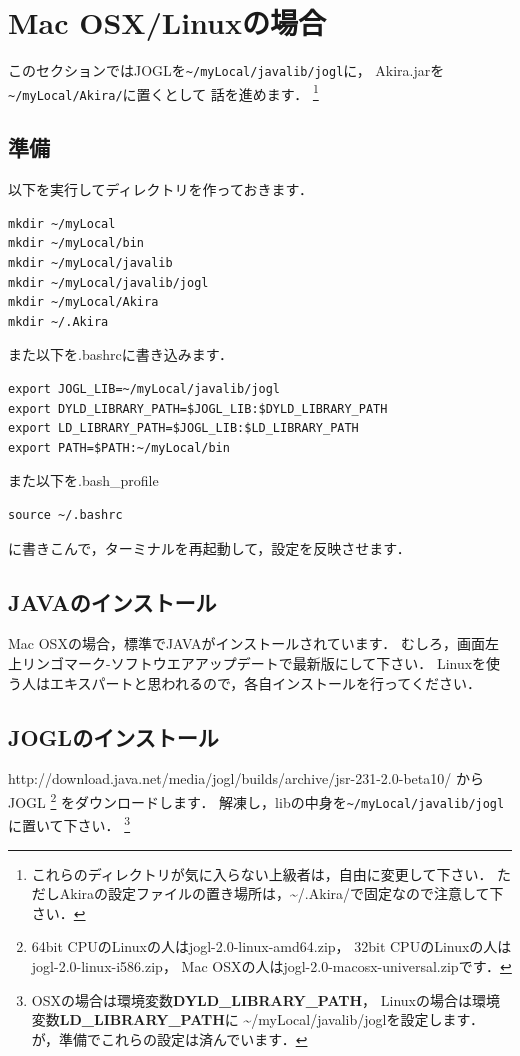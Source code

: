 \documentclass[a4j,openany]{jbook}
\begin{document}
 \section{Mac OSX/Linuxの場合}
 このセクションではJOGLを\verb|~/myLocal/javalib/jogl|に，
 Akira.jarを\verb|~/myLocal/Akira/|に置くとして
 話を進めます．
 \footnote{これらのディレクトリが気に入らない上級者は，自由に変更して下さい．
 ただしAkiraの設定ファイルの置き場所は，\~{}/.Akira/で固定なので注意して下さい．}

  \subsection{準備}
  以下を実行してディレクトリを作っておきます．
   \begin{screen}
\begin{verbatim}
mkdir ~/myLocal
mkdir ~/myLocal/bin
mkdir ~/myLocal/javalib
mkdir ~/myLocal/javalib/jogl
mkdir ~/myLocal/Akira
mkdir ~/.Akira
\end{verbatim}
   \end{screen}

また以下を.bashrcに書き込みます．
    \begin{screen}
\begin{verbatim}
export JOGL_LIB=~/myLocal/javalib/jogl
export DYLD_LIBRARY_PATH=$JOGL_LIB:$DYLD_LIBRARY_PATH
export LD_LIBRARY_PATH=$JOGL_LIB:$LD_LIBRARY_PATH
export PATH=$PATH:~/myLocal/bin
\end{verbatim}
    \end{screen}
また以下を.bash\_profile
    \begin{screen}
\begin{verbatim}
source ~/.bashrc
\end{verbatim}
    \end{screen}
に書きこんで，ターミナルを再起動して，設定を反映させます．

  \subsection{JAVAのインストール}
  Mac OSXの場合，標準でJAVAがインストールされています．
  むしろ，画面左上リンゴマーク-ソフトウエアアップデートで最新版にして下さい．
  Linuxを使う人はエキスパートと思われるので，各自インストールを行ってください．

  \subsection{JOGLのインストール}
  {http://download.java.net/media/jogl/builds/archive/jsr-231-2.0-beta10/}
  からJOGL
  \footnote{
  64bit CPUのLinuxの人はjogl-2.0-linux-amd64.zip，
  32bit CPUのLinuxの人はjogl-2.0-linux-i586.zip，
  Mac OSXの人はjogl-2.0-macosx-universal.zipです．
  }
  をダウンロードします．
  解凍し，libの中身を\verb|~/myLocal/javalib/jogl|に置いて下さい．
  \footnote{
  OSXの場合は環境変数{\bf DYLD\_LIBRARY\_PATH}，
  Linuxの場合は環境変数{\bf LD\_LIBRARY\_PATH}に
  \~{}/myLocal/javalib/joglを設定します．
  が，準備でこれらの設定は済んでいます．
  }
\end{document}

